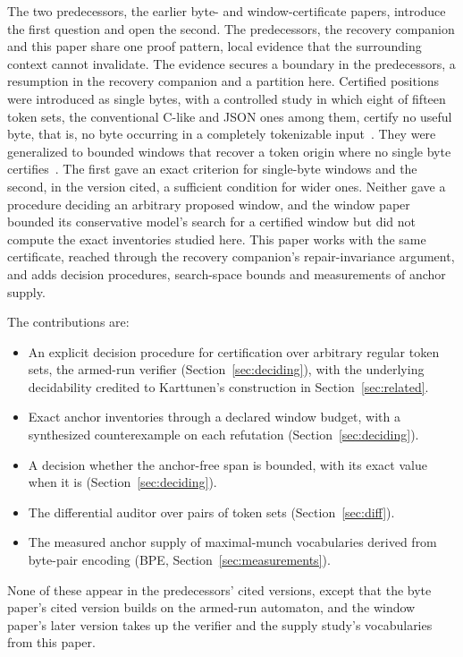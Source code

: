 \documentclass[11pt,a4paper]{article}
\theoremstyle{definition}
\theoremstyle{plain}
\begin{document}
The two predecessors, the earlier byte- and window-certificate papers, introduce the first question and open the second.
The predecessors, the recovery companion and this paper share one proof pattern, local evidence that the surrounding
context cannot invalidate. The evidence secures a boundary in the predecessors, a resumption in the recovery companion
and a partition here. Certified positions were introduced as single bytes, with a controlled study in which eight of
fifteen token sets, the conventional C-like and JSON ones among them, certify no useful byte, that is, no byte occurring
in a completely tokenizable input~\citep{nidhogg2026splitpoints}. They were generalized to bounded windows that recover
a token origin where no single byte certifies~\citep{nidhogg2026splitwindows}. The first gave an exact criterion for
single-byte windows and the second, in the version cited, a sufficient condition for wider ones. Neither gave a
procedure deciding an arbitrary proposed window, and the window paper bounded its conservative model's search for a
certified window but did not compute the exact inventories studied here. This paper works with the same certificate,
reached through the recovery companion's repair-invariance argument, and adds decision procedures, search-space bounds
and measurements of anchor supply.

The contributions are:

\begin{itemize}
\item An explicit decision procedure for certification over arbitrary regular token sets, the armed-run verifier
(Section~\ref{sec:deciding}), with the underlying decidability credited to Karttunen's construction in
Section~\ref{sec:related}.
\item Exact anchor inventories through a declared window budget, with a synthesized counterexample on each refutation
(Section~\ref{sec:deciding}).
\item A decision whether the anchor-free span is bounded, with its exact value when it is (Section~\ref{sec:deciding}).
\item The differential auditor over pairs of token sets (Section~\ref{sec:diff}).
\item The measured anchor supply of maximal-munch vocabularies derived from byte-pair encoding (BPE,
Section~\ref{sec:measurements}).
\end{itemize}
None of these appear in the predecessors' cited versions, except that the byte paper's cited version builds on the
armed-run automaton, and the window paper's later version takes up the verifier and the supply study's vocabularies from
this paper.
\end{document}
